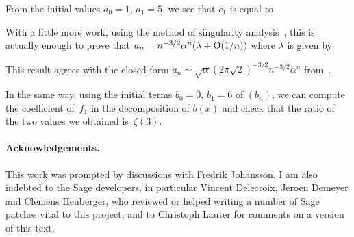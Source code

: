 \documentclass[runningheads,a4paper]{llncs}
\begin{document}
\begin{example}
  
  {\noindent}From the initial values $a_0 = 1$, $a_1 = 5$,  we see that $c_1$
  is equal to
  
  
  {\noindent}With a little more work, using the method of singularity
  analysis~{\cite{FlajoletSedgewick2009}}, this is actually enough to prove
  that $a_n = n^{- 3 / 2} \alpha^n  (\lambda + \mathrm{O} (1 / n))$ where
  $\lambda$ is given by
  
  
  {\noindent}This result agrees with the closed form $a_n \sim \sqrt{\alpha}
  (2 \pi \sqrt{2})^{- 3 / 2} n^{- 3 / 2} \alpha^n$ from~{\cite{Hirschhorn2012}}.
  
  In the same way, using the initial terms $b_0 = 0$, $b_1 = 6$ of $(b_n)$, we
  can compute the coefficient of~$f_1$ in the decomposition of $b (x)$ and
  check that the ratio of the two values we obtained is~$\zeta (3)$.
  
\end{example}

\paragraph{Acknowledgements.}This work was prompted by discussions with
Fredrik Johansson. I am also indebted to the Sage developers, in particular
Vincent Delecroix, Jeroen Demeyer and Clemens Heuberger, who reviewed or
helped writing a number of Sage patches vital to this project, and to Christoph Lauter for comments on a version of this text.
\end{document}
